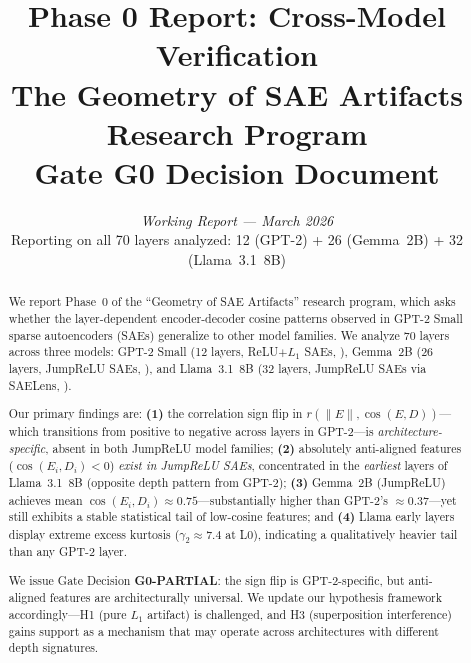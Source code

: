 \documentclass[11pt,a4paper]{article}
\title{\Large\bfseries Phase 0 Report: Cross-Model Verification\\[0.5em]
\large The Geometry of SAE Artifacts Research Program\\[0.3em]
\normalsize Gate G0 Decision Document}
\author{\textit{Working Report --- March 2026}\\[0.3em]
\small Reporting on all 70 layers analyzed: 12 (GPT-2) + 26 (Gemma~2B) + 32 (Llama~3.1~8B)}
\date{}
\newcommand{\cosED}{\cos(E_i, D_i)}
\newcommand{\rPearson}{r(\|E\|, \cos(E,D))}
\begin{document}
\maketitle
\thispagestyle{fancy}

\begin{abstract}
\noindent We report Phase~0 of the ``Geometry of SAE Artifacts'' research program, which asks whether the layer-dependent encoder-decoder cosine patterns observed in GPT-2 Small sparse autoencoders (SAEs) generalize to other model families. We analyze 70 layers across three models: GPT-2 Small (12 layers, ReLU$+L_1$ SAEs, \citealt{bloom2024}), Gemma~2B (26 layers, JumpReLU SAEs, \citealt{lieberum2024}), and Llama~3.1~8B (32 layers, JumpReLU SAEs via SAELens, \citealt{he2024}).

Our primary findings are: \textbf{(1)} the correlation sign flip in $\rPearson$---which transitions from positive to negative across layers in GPT-2---is \emph{architecture-specific}, absent in both JumpReLU model families; \textbf{(2)} absolutely anti-aligned features ($\cosED < 0$) \emph{exist in JumpReLU SAEs}, concentrated in the \emph{earliest} layers of Llama~3.1~8B (opposite depth pattern from GPT-2); \textbf{(3)} Gemma~2B (JumpReLU) achieves mean $\cosED \approx 0.75$---substantially higher than GPT-2's $\approx 0.37$---yet still exhibits a stable statistical tail of low-cosine features; and \textbf{(4)} Llama early layers display extreme excess kurtosis ($\gamma_2 \approx 7.4$ at L0), indicating a qualitatively heavier tail than any GPT-2 layer.

We issue Gate Decision \textbf{G0-PARTIAL}: the sign flip is GPT-2-specific, but anti-aligned features are architecturally universal. We update our hypothesis framework accordingly---H1 (pure $L_1$ artifact) is challenged, and H3 (superposition interference) gains support as a mechanism that may operate across architectures with different depth signatures.
\end{abstract}

\medskip\noindent{}
\end{document}
